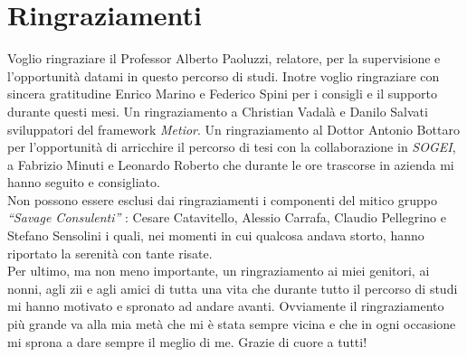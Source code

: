 \chapter{Ringraziamenti}
\label{cha:acknowledgements}

Voglio ringraziare il Professor Alberto Paoluzzi, relatore, per la supervisione e l'opportunità datami in questo percorso di studi.
Inotre voglio ringraziare con sincera gratitudine Enrico Marino e Federico Spini per i consigli e il supporto durante questi mesi.
Un ringraziamento a Christian Vadalà e Danilo Salvati sviluppatori del framework \emph{Metior}.
Un ringraziamento al Dottor Antonio Bottaro per l'opportunità di arricchire il percorso di tesi con la collaborazione in \emph{SOGEI},
a Fabrizio Minuti e Leonardo Roberto che durante le ore trascorse in azienda mi hanno seguito e consigliato.\\
\indent
Non possono essere esclusi dai ringraziamenti i componenti del mitico gruppo \emph{``Savage Consulenti''} :
Cesare Catavitello, Alessio Carrafa, Claudio Pellegrino e Stefano Sensolini i quali, nei momenti in cui qualcosa andava
storto, hanno riportato la serenità con tante risate.\\
\indent
Per ultimo, ma non meno importante, un ringraziamento ai miei genitori, ai nonni, agli zii e agli amici di tutta una vita
che durante tutto il percorso di studi mi hanno motivato e spronato ad andare avanti.
Ovviamente il ringraziamento più grande va alla mia metà che mi è stata sempre vicina e che in ogni occasione mi sprona
a dare sempre il meglio di me. Grazie di cuore a tutti!
